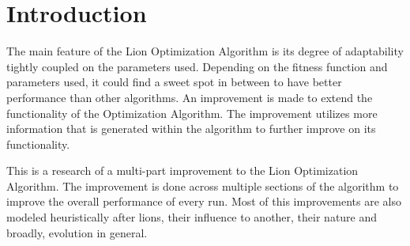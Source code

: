 \section{Introduction}
\par The main feature of the Lion Optimization Algorithm is its degree of adaptability tightly coupled on the parameters used. Depending on the fitness function and parameters used, it could find a sweet spot in between to have better performance than other algorithms. An improvement is made to extend the functionality of the Optimization Algorithm. The improvement utilizes more information that is generated within the algorithm to further improve on its functionality.

\par This is a research of a multi-part improvement to the Lion Optimization Algorithm. The improvement is done across multiple sections of the algorithm to improve the overall performance of every run. Most of this improvements are also modeled heuristically after lions, their influence to another, their nature and broadly, evolution in general.
